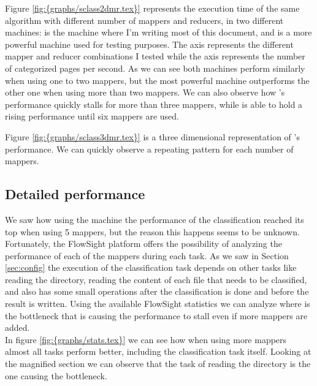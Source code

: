 Figure \ref{fig:{graphs/sclass2dmr.tex}} represents the execution time of the same algorithm with different number of mappers and reducers, in two different machines:  
is the machine where I'm writing most of this document, and  is a more powerful machine used for testing purposes. The  axis represents the 
different mapper and reducer combinations I tested while the  axis represents the number of categorized pages per second.
As we can see both machines perform similarly when using one to two mappers, but the most powerful machine outperforms the other one when using more than two mappers. We can also observe how 's performance
quickly stalls for more than three mappers, while  is able to hold a rising performance until six mappers are used.

Figure \ref{fig:{graphs/sclass3dmr.tex}} is a three dimensional representation of 's performance. We can quickly observe a repeating pattern for each number of mappers.

\subsection{Detailed performance}
We saw how using the  machine the performance of the classification reached its top when using 5 mappers, but the reason this happens seems to be unknown. 
Fortunately, the FlowSight platform offers the possibility of analyzing the performance of each of the mappers during each task. As we saw in Section \ref{sec:config} the execution of the classification
task depends on other tasks like reading the directory, reading the content of each file that needs to be classified, and also has some small operations after the classification is done and before
the result is written. Using the available FlowSight statistics we can analyze where is the bottleneck that is causing the performance to stall even if more mappers are added. \\ 
In figure \ref{fig:{graphs/stats.tex}} we can see how when using more mappers almost all tasks perform better, including the classification task itself. Looking at the magnified section we can observe
that the task of reading the directory is the one causing the bottleneck. 


